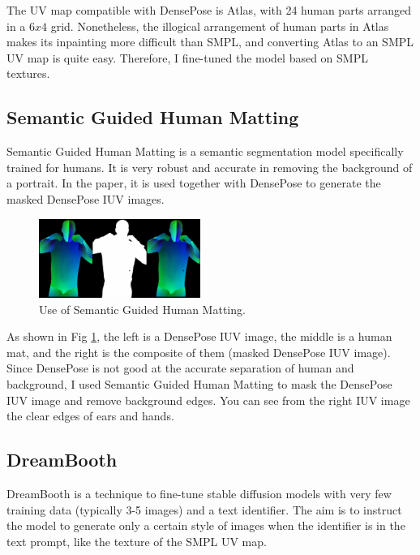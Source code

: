 \documentclass[acmtog]{acmart}
\begin{document}
The UV map compatible with DensePose is Atlas, with 24 human parts arranged in a \(6x4\) grid. Nonetheless, the illogical arrangement of human parts in Atlas makes its inpainting more difficult than SMPL, and converting Atlas to an SMPL UV map is quite easy. Therefore, I fine-tuned the model based on SMPL textures.

\subsection{Semantic Guided Human Matting}

Semantic Guided Human Matting \cite{chen2022robust} is a semantic segmentation model specifically trained for humans. It is very robust and accurate in removing the background of a portrait. In the paper, it is used together with DensePose to generate the masked DensePose IUV images.

\begin{figure}[h]
  \centering
  \includegraphics[width=0.47\textwidth]{figs/human_matting.png}
  \caption{Use of Semantic Guided Human Matting.}
  \label{fig:human_mat}
\end{figure}

As shown in Fig \ref{fig:human_mat}, the left is a DensePose IUV image, the middle is a human mat, and the right is the composite of them (masked DensePose IUV image). Since DensePose is not good at the accurate separation of human and background, I used Semantic Guided Human Matting to mask the DensePose IUV image and remove background edges. You can see from the right IUV image the clear edges of ears and hands.

\subsection{DreamBooth}

DreamBooth \cite{ruiz2023dreambooth} is a technique to fine-tune stable diffusion models with very few training data (typically 3-5 images) and a text identifier. The aim is to instruct the model to generate only a certain style of images when the identifier is in the text prompt, like the texture of the SMPL UV map.
\end{document}
